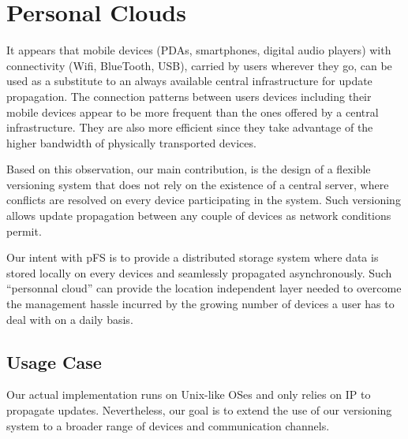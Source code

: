 


\section{Personal Clouds}
\label{sec:model}


It appears that mobile devices (PDAs, smartphones, digital audio
players) with connectivity (Wifi, BlueTooth, USB), carried by users
wherever they go, can be used as a substitute to an always available
central infrastructure for update propagation. The connection patterns
between users devices including their mobile devices appear to be more
frequent than the ones offered by a central infrastructure. They are
also more efficient since they take advantage of the higher bandwidth
of physically transported devices.

Based on this observation, our main contribution, is the design of a
flexible versioning system that does not rely on the existence of a
central server, where conflicts are resolved on every device
participating in the system. Such versioning allows update propagation
between any couple of devices as network conditions permit.

Our intent with pFS is to provide a distributed storage system where
data is stored locally on every devices and seamlessly propagated
asynchronously. Such ``personnal cloud'' can provide the location
independent layer needed to overcome the management hassle incurred by
the growing number of devices a user has to deal with on a daily
basis.

\subsection{Usage Case}

Our actual implementation runs on Unix-like OSes and only relies on IP
to propagate updates. Nevertheless, our goal is to extend the use of
our versioning system to a broader range of devices and communication
channels.

